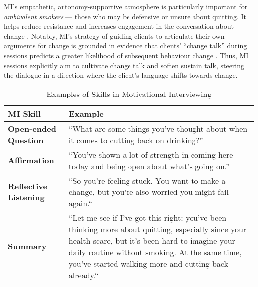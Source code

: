 MI's empathetic, autonomy-supportive atmosphere is particularly important for \emph{ambivalent smokers} --- those who may be defensive or unsure about quitting. It helps reduce resistance and increases engagement in the conversation about change \cite{Rollnick1997, MillerRollnick2023}. Notably, MI's strategy of guiding clients to articulate their own arguments for change is grounded in evidence that clients' ``change talk'' during sessions predicts a greater likelihood of subsequent behaviour change \cite{MillerRose2009}. Thus, MI sessions explicitly aim to cultivate change talk and soften sustain talk, steering the dialogue in a direction where the client's language shifts towards change.



\begin{table}[ht!]
\centering
\begin{tabular}{@{} p{} p{} @{}}
\toprule
\textbf{MI Skill} & \textbf{Example} \\
\midrule
\textbf{Open-ended Question} & 
``What are some things you've thought about when it comes to cutting back on drinking?'' \\
\addlinespace
\textbf{Affirmation} & 
``You've shown a lot of strength in coming here today and being open about what’s going on.'' \\
\addlinespace
\textbf{Reflective Listening} & 
``So you're feeling stuck. You want to make a change, but you're also worried you might fail again.`` \\
\addlinespace
\textbf{Summary} & 
``Let me see if I've got this right: you've been thinking more about quitting, especially since your health scare, but it's been hard to imagine your daily routine without smoking. At the same time, you’ve started walking more and cutting back already.`` \\
\bottomrule
\end{tabular}
\caption{Examples of Skills in Motivational Interviewing}
\label{tab:mi_skill_examples}
\end{table}




